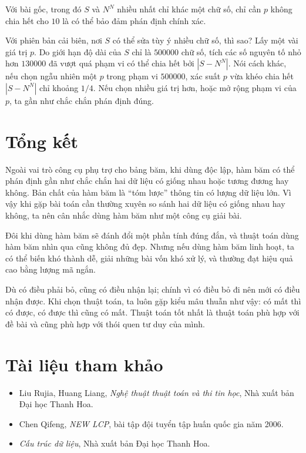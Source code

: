 \documentclass[11pt]{article}
\begin{document}
Với bài gốc, trong đó $S$ và $N^N$ nhiều nhất chỉ khác một chữ số, chỉ cần
$p$ không chia hết cho $10$ là có thể bảo đảm phán định chính xác.

Với phiên bản cải biên, nơi $S$ có thể sửa tùy ý nhiều chữ số, thì sao? Lấy
một vài giá trị $p$. Do giới hạn độ dài của $S$ chỉ là $500000$ chữ số, tích
các số nguyên tố nhỏ hơn $130000$ đã vượt quá phạm vi có thể chia hết bởi
$|S-N^N|$. Nói cách khác, nếu chọn ngẫu nhiên một $p$ trong phạm vi $500000$,
xác suất $p$ vừa khéo chia hết $|S-N^N|$ chỉ khoảng $1/4$. Nếu chọn nhiều
giá trị hơn, hoặc mở rộng phạm vi của $p$, ta gần như chắc chắn phán định
đúng.

\section*{Tổng kết}

Ngoài vai trò công cụ phụ trợ cho bảng băm, khi dùng độc lập, hàm băm có thể
phán định gần như chắc chắn hai dữ liệu có giống nhau hoặc tương đương hay
không. Bản chất của hàm băm là ``tóm lược'' thông tin có lượng dữ liệu lớn.
Vì vậy khi gặp bài toán cần thường xuyên so sánh hai dữ liệu có giống nhau
hay không, ta nên cân nhắc dùng hàm băm như một công cụ giải bài.

Đôi khi dùng hàm băm sẽ đánh đổi một phần tính đúng đắn, và thuật toán dùng
hàm băm nhìn qua cũng không đủ đẹp. Nhưng nếu dùng hàm băm linh hoạt, ta có
thể biến khó thành dễ, giải những bài vốn khó xử lý, và thường đạt hiệu quả
cao bằng lượng mã ngắn.

Dù có điều phải bỏ, cũng có điều nhận lại; chính vì có điều bỏ đi nên mới có
điều nhận được. Khi chọn thuật toán, ta luôn gặp kiểu mâu thuẫn như vậy: có
mất thì có được, có được thì cũng có mất. Thuật toán tốt nhất là thuật toán
phù hợp với đề bài và cũng phù hợp với thói quen tư duy của mình.

\section*{Tài liệu tham khảo}

\begin{itemize}
  \item Liu Rujia, Huang Liang, \textit{Nghệ thuật thuật toán và thi tin học},
  Nhà xuất bản Đại học Thanh Hoa.
  \item Chen Qifeng, \textit{NEW LCP}, bài tập đội tuyển tập huấn quốc gia
  năm 2006.
  \item \textit{Cấu trúc dữ liệu}, Nhà xuất bản Đại học Thanh Hoa.
\end{itemize}
\end{document}
